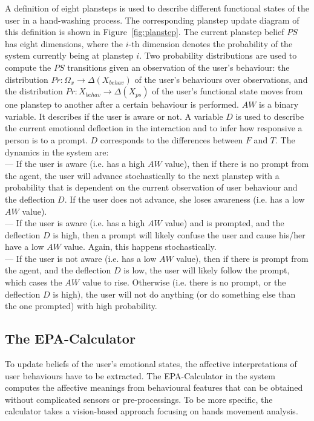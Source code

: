 A definition of eight plansteps is used to describe different functional states of the user in a hand-washing process. The corresponding planstep update diagram of this definition is shown in Figure~\ref{fig:planstep}. The current planstep belief $PS$ has eight dimensions, where the $i$-th dimension denotes the probability of the system currently being at planstep $i$. Two probability distributions are used to compute the $PS$ transitions given an observation of the user's behaviour: the distribution $Pr: \Omega_{x} \to \Delta(X_{behav})$ of the user's behaviours over observations, and the distribution $Pr: X_{behav} \to \Delta(X_{ps})$ of the user's functional state moves from one planstep to another after a certain behaviour is performed. $AW$ is a binary variable. It describes if the user is aware or not. A variable $D$ is used to describe the current emotional deflection in the interaction and to infer how responsive a person is to a prompt. $D$ corresponds to the differences between $F$ and $T$. The dynamics in the system are: \\
--- If the user is aware (i.e. has a high $AW$ value), then if there is no prompt from the agent, the user will advance stochastically to the next planstep with a probability that is dependent on the current observation of user behaviour and the deflection $D$. If the user does not advance, she loses awareness (i.e. has a low $AW$ value). \\
--- If the user is aware (i.e. has a high $AW$ value) and is prompted, and the deflection $D$ is high, then a prompt will likely confuse the user and cause his/her have a low $AW$ value. Again, this happens stochastically. \\
--- If the user is not aware (i.e. has a low $AW$ value), then if there is prompt from the agent, and the deflection $D$ is low, the user will likely follow the prompt, which cases the $AW$ value to rise. Otherwise (i.e. there is no prompt, or the deflection $D$ is high), the user will not do anything (or do something else than the one prompted) with high probability.


\subsection{The EPA-Calculator}

To update beliefs of the user's emotional states, the affective interpretations of user behaviours have to be extracted. The EPA-Calculator in the system computes the affective meanings from behavioural features that can be obtained without complicated sensors or pre-processings. To be more specific, the calculator takes a vision-based approach focusing on hands movement analysis.

